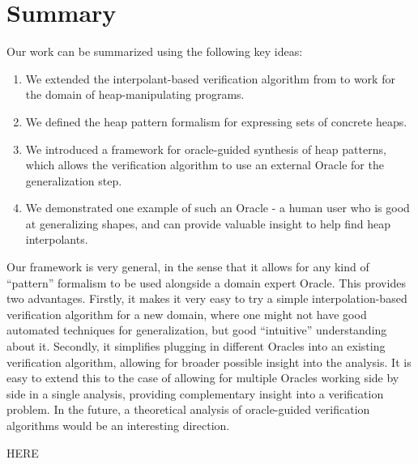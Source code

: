 \section{Summary}
Our work can be summarized using the following key ideas:

\begin{enumerate}
  \item We extended the interpolant-based verification algorithm from \cite{mcmillan06} to work for the domain of heap-manipulating programs.
  \item We defined the heap pattern formalism for expressing sets of concrete heaps.
  \item We introduced a framework for oracle-guided synthesis of heap patterns, which allows the verification algorithm to use an external Oracle for the generalization step.
  \item We demonstrated one example of such an Oracle - a human user who is good at generalizing shapes, and can provide valuable insight to help find heap interpolants.
\end{enumerate}

Our framework is very general, in the sense that it allows for any kind of ``pattern''
formalism to be used alongside a domain expert Oracle. This provides two advantages.
Firstly, it makes it very easy to try a simple interpolation-based verification
algorithm for a new domain, where one might not have good automated techniques for
generalization, but good ``intuitive'' understanding about it. Secondly, it simplifies
plugging in different Oracles into an existing verification algorithm, allowing for
broader possible insight into the analysis. It is easy to extend this to the case of
allowing for multiple Oracles working side by side in a single analysis, providing
complementary insight into a verification problem. In the future, a theoretical analysis
of oracle-guided verification algorithms would be an interesting direction.

HERE

